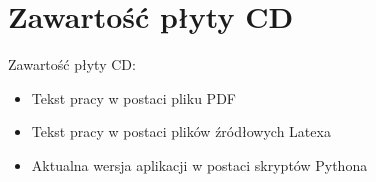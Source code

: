 \chapter{Zawartość płyty CD}
Zawartość płyty CD:
\begin{itemize}
\item Tekst pracy w postaci pliku PDF
\item Tekst pracy w postaci plików źródłowych Latexa
\item Aktualna wersja aplikacji w postaci skryptów Pythona
\end{itemize}